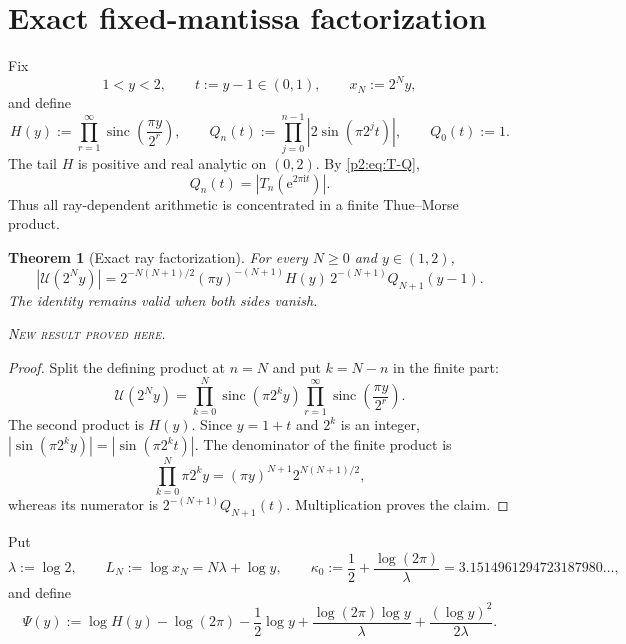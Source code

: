 \documentclass[11pt,oneside]{article}
\newtheorem{theorem}{Theorem}[section]
\theoremstyle{definition}
\theoremstyle{remark}
\newcommand{\sinc}{\operatorname{sinc}}
\newcommand{\e}{\mathrm e}
\newcommand{\ii}{\mathrm i}
\newcommand{\newresult}{\textcolor{newgreen}{\textsc{New result proved here.}}}
\begin{document}
\section{Exact fixed-mantissa factorization}\label{p2:sec:factorization}

Fix
\[
 1<y<2,\qquad t:=y-1\in(0,1),\qquad x_N:=2^Ny,
\]
and define
\begin{equation}
 H(y):=\prod_{r=1}^{\infty}\sinc\!\left(\frac{\pi y}{2^r}\right),
 \qquad
 Q_n(t):=\prod_{j=0}^{n-1}|2\sin(\pi2^jt)|,
 \qquad Q_0(t):=1.
 \label{p2:eq:H-Q-def}
\end{equation}
The tail $H$ is positive and real analytic on $(0,2)$. By \eqref{p2:eq:T-Q},
\begin{equation}
 Q_n(t)=|T_n(\e^{2\pi\ii t})|.
 \label{p2:eq:Q-as-T}
\end{equation}
Thus all ray-dependent arithmetic is concentrated in a finite Thue--Morse product.

\begin{theorem}[Exact ray factorization]\label{p2:thm:exact-factorization}
For every $N\ge0$ and $y\in(1,2)$,
\begin{equation}
 \boxed{
 |\mathscr U(2^Ny)|
 =2^{-N(N+1)/2}(\pi y)^{-(N+1)}H(y)\,2^{-(N+1)}Q_{N+1}(y-1).}
 \label{p2:eq:exact-factorization}
\end{equation}
The identity remains valid when both sides vanish.

\smallskip\noindent\newresult
\end{theorem}

\begin{proof}
Split the defining product at $n=N$ and put $k=N-n$ in the finite part:
\[
 \mathscr U(2^Ny)=\prod_{k=0}^{N}\sinc(\pi2^ky)
 \prod_{r=1}^{\infty}\sinc\!\left(\frac{\pi y}{2^r}\right).
\]
The second product is $H(y)$. Since $y=1+t$ and $2^k$ is an integer,
$|\sin(\pi2^ky)|=|\sin(\pi2^kt)|$. The denominator of the finite product is
\[
 \prod_{k=0}^{N}\pi2^ky=(\pi y)^{N+1}2^{N(N+1)/2},
\]
whereas its numerator is $2^{-(N+1)}Q_{N+1}(t)$. Multiplication proves the claim.
\end{proof}

Put
\begin{equation}
 \lambda:=\log2,
 \qquad L_N:=\log x_N=N\lambda+\log y,
 \qquad
 \kappa_0:=\frac12+\frac{\log(2\pi)}{\lambda}
 =3.1514961294723187980\ldots,
 \label{p2:eq:lambda-kappa0}
\end{equation}
and define
\begin{equation}
 \Psi(y):=\log H(y)-\log(2\pi)-\frac12\log y
 +\frac{\log(2\pi)\log y}{\lambda}
 +\frac{(\log y)^2}{2\lambda}.
 \label{p2:eq:Psi-def}
\end{equation}
\end{document}
